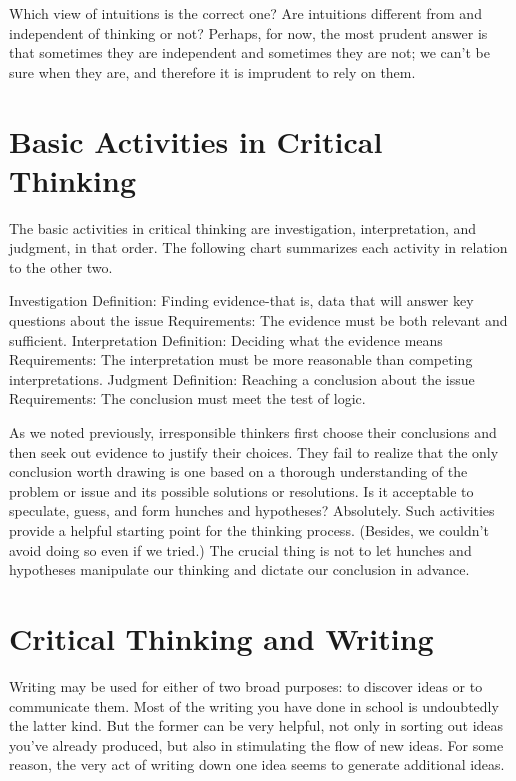 \documentclass{book}
\begin{document}
Which view of intuitions is the correct one? Are intuitions different from and independent of thinking or not? Perhaps, for now, the most prudent answer is that sometimes they are independent and sometimes they are not; we can’t be sure when they are, and therefore it is imprudent to rely on them.

\section{Basic Activities in Critical Thinking}

The basic activities in critical thinking are investigation, interpretation, and judgment, in that order. The following chart summarizes each activity in relation to the other two.

Investigation
    Definition: Finding evidence-that is, data that will answer key questions about the issue
    Requirements: The evidence must be both relevant and sufficient.
Interpretation
    Definition: Deciding what the evidence means
    Requirements: The interpretation must be more reasonable than competing interpretations.
Judgment
    Definition: Reaching a conclusion about the issue
    Requirements: The conclusion must meet the test of logic.

As we noted previously, irresponsible thinkers first choose their conclusions and then seek out evidence to justify their choices. They fail to realize that the only conclusion worth drawing is one based on a thorough understanding of the problem or issue and its possible solutions or resolutions. Is it acceptable to speculate, guess, and form hunches and hypotheses? Absolutely. Such activities provide a helpful starting point for the thinking process. (Besides, we couldn’t avoid doing so even if we tried.) The crucial thing is not to let hunches and hypotheses manipulate our thinking and dictate our conclusion in advance.

\section{Critical Thinking and Writing}

Writing may be used for either of two broad purposes: to discover ideas or to communicate them. Most of the writing you have done in school is undoubtedly the latter kind. But the former can be very helpful, not only in sorting out ideas you’ve already produced, but also in stimulating the flow of new ideas. For some reason, the very act of writing down one idea seems to generate additional ideas.
\end{document}
